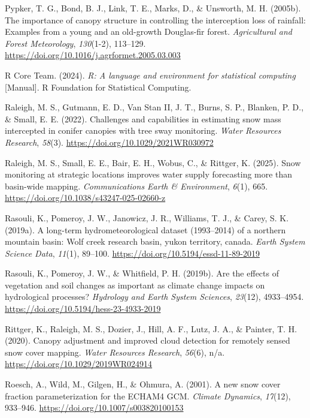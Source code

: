 \documentclass[
  letterpaper,
]{tex/uofsthesis-cs}
\newlength{\cslhangindent}
\newenvironment{CSLReferences}[2] %
 {\begin{list}{}{%
  \setlength{\itemindent}{0pt}
  \setlength{\leftmargin}{0pt}
  \setlength{\parsep}{0pt}
  \ifodd #1
   \setlength{\leftmargin}{\cslhangindent}
   \setlength{\itemindent}{-1\cslhangindent}
  \fi
  \setlength{\itemsep}{#2\baselineskip}}}
 {\end{list}}
\begin{document}
\begin{CSLReferences}{1}{0}
Pypker, T. G., Bond, B. J., Link, T. E., Marks, D., \& Unsworth, M. H.
(2005b). The importance of canopy structure in controlling the
interception loss of rainfall: {Examples} from a young and an old-growth
{Douglas-fir} forest. \emph{Agricultural and Forest Meteorology},
\emph{130}(1-2), 113--129.
\url{https://doi.org/10.1016/j.agrformet.2005.03.003}

R Core Team. (2024). \emph{R: A language and environment for statistical
computing} {[}Manual{]}. R Foundation for Statistical Computing.

Raleigh, M. S., Gutmann, E. D., Van Stan II, J. T., Burns, S. P.,
Blanken, P. D., \& Small, E. E. (2022). Challenges and capabilities in
estimating snow mass intercepted in conifer canopies with tree sway
monitoring. \emph{Water Resources Research}, \emph{58}(3).
\url{https://doi.org/10.1029/2021WR030972}

Raleigh, M. S., Small, E. E., Bair, E. H., Wobus, C., \& Rittger, K.
(2025). Snow monitoring at strategic locations improves water supply
forecasting more than basin-wide mapping. \emph{Communications Earth \&
Environment}, \emph{6}(1), 665.
\url{https://doi.org/10.1038/s43247-025-02660-z}

Rasouli, K., Pomeroy, J. W., Janowicz, J. R., Williams, T. J., \& Carey,
S. K. (2019a). A long-term hydrometeorological dataset (1993--2014) of a
northern mountain basin: {Wolf} creek research basin, yukon territory,
canada. \emph{Earth System Science Data}, \emph{11}(1), 89--100.
\url{https://doi.org/10.5194/essd-11-89-2019}

Rasouli, K., Pomeroy, J. W., \& Whitfield, P. H. (2019b). Are the
effects of vegetation and soil changes as important as climate change
impacts on hydrological processes? \emph{Hydrology and Earth System
Sciences}, \emph{23}(12), 4933--4954.
\url{https://doi.org/10.5194/hess-23-4933-2019}

Rittger, K., Raleigh, M. S., Dozier, J., Hill, A. F., Lutz, J. A., \&
Painter, T. H. (2020). Canopy adjustment and improved cloud detection
for remotely sensed snow cover mapping. \emph{Water Resources Research},
\emph{56}(6), n/a. \url{https://doi.org/10.1029/2019WR024914}

Roesch, A., Wild, M., Gilgen, H., \& Ohmura, A. (2001). A new snow cover
fraction parameterization for the {ECHAM4 GCM}. \emph{Climate Dynamics},
\emph{17}(12), 933--946. \url{https://doi.org/10.1007/s003820100153}


\end{CSLReferences}
\end{document}
